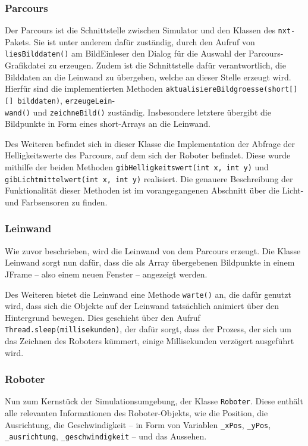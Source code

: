 \documentclass[paper=a4, DIV=calc, BCOR=12mm, twoside=on, onecolumn=on, open = right, titlepage =on, parskip =half-, headsepline = on, footsepline = off, chapterprefix = off, appendixprefix = on, fontsize = 12pt, numbers = noenddot, abstract = on]{scrbook}
\begin{document}
\subsubsection{Parcours}
\label{sec:parcours}
Der Parcours ist die Schnittstelle zwischen Simulator und den Klassen des \texttt{nxt-}Pakets. Sie ist unter anderem dafür zuständig, durch den Aufruf von \texttt{liesBilddaten()} am BildEinleser den Dialog für die Auswahl der Parcours-Grafikdatei zu erzeugen. Zudem ist die Schnittstelle dafür verantwortlich, die Bilddaten an die Leinwand zu übergeben, welche an dieser Stelle erzeugt wird. Hierfür sind die implementierten Methoden \texttt{aktualisiere\-Bildgroes\-se(short[][] bild\-daten)}, \hfill \texttt{er\-zeu\-geLein}-\\\texttt{wand()} und \texttt{zeichneBild()} zuständig. Insbesondere letztere übergibt die Bildpunkte in Form eines short-Arrays an die Leinwand.

Des Weiteren befindet sich in dieser Klasse die Implementation der Abfrage der Helligkeitswerte des Parcours, auf dem sich der Roboter befindet. Diese wurde mithilfe der beiden Methoden \texttt{gib\-Hellig\-keits\-wert(int x, int y)} und \texttt{gib\-Licht\-mittel\-wert(int x, int y)} realisiert. Die genauere Beschreibung der Funktionalität dieser Methoden ist im vorangegangenen Abschnitt über die Licht- und Farbsensoren zu finden.

\subsubsection{Leinwand}
Wie zuvor beschrieben, wird die Leinwand von dem Parcours erzeugt. Die Klasse Leinwand sorgt nun dafür, dass die als Array übergebenen Bildpunkte in einem JFrame -- also einem neuen Fenster -- angezeigt werden.

Des Weiteren bietet die Leinwand eine Methode \texttt{warte()} an, die dafür genutzt wird, dass sich die Objekte auf der Leinwand tatsächlich animiert über den Hintergrund bewegen. Dies geschieht über den Aufruf \texttt{Thread.sleep(millise\-kun\-den)}, der dafür sorgt, dass der Prozess, der sich um das Zeichnen des Roboters kümmert, einige Millisekunden verzögert ausgeführt wird.

\subsubsection{Roboter}
Nun zum Kernstück der Simulationsumgebung, der Klasse \texttt{Roboter}. Diese enthält alle relevanten Informationen des Roboter-Objekts, wie die Position, die Ausrichtung, die Geschwindigkeit -- in Form von Variablen \texttt{{\_}xPos}, \texttt{{\_}yPos}, \texttt{{\_}aus\-rich\-tung},  \texttt{{\_}ge\-schwin\-dig\-keit} -- und das Aussehen. 
\end{document}
